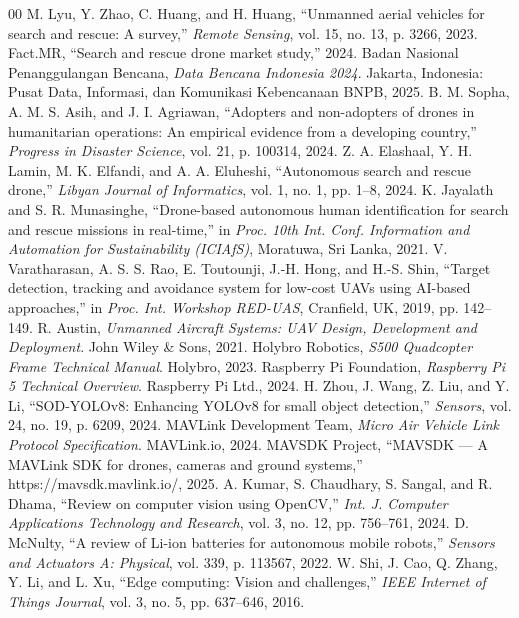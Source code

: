 \documentclass[conference]{IEEEtran}
\begin{document}
\begin{thebibliography}{00}
 M. Lyu, Y. Zhao, C. Huang, and H. Huang, ``Unmanned aerial vehicles for search and rescue: A survey,'' \textit{Remote Sensing}, vol. 15, no. 13, p. 3266, 2023.
 Fact.MR, ``Search and rescue drone market study,'' 2024.
 Badan Nasional Penanggulangan Bencana, \textit{Data Bencana Indonesia 2024}. Jakarta, Indonesia: Pusat Data, Informasi, dan Komunikasi Kebencanaan BNPB, 2025.
 B. M. Sopha, A. M. S. Asih, and J. I. Agriawan, ``Adopters and non-adopters of drones in humanitarian operations: An empirical evidence from a developing country,'' \textit{Progress in Disaster Science}, vol. 21, p. 100314, 2024.
 Z. A. Elashaal, Y. H. Lamin, M. K. Elfandi, and A. A. Eluheshi, ``Autonomous search and rescue drone,'' \textit{Libyan Journal of Informatics}, vol. 1, no. 1, pp. 1--8, 2024.
 K. Jayalath and S. R. Munasinghe, ``Drone-based autonomous human identification for search and rescue missions in real-time,'' in \textit{Proc. 10th Int. Conf. Information and Automation for Sustainability (ICIAfS)}, Moratuwa, Sri Lanka, 2021.
 V. Varatharasan, A. S. S. Rao, E. Toutounji, J.-H. Hong, and H.-S. Shin, ``Target detection, tracking and avoidance system for low-cost UAVs using AI-based approaches,'' in \textit{Proc. Int. Workshop RED-UAS}, Cranfield, UK, 2019, pp. 142--149.
 R. Austin, \textit{Unmanned Aircraft Systems: UAV Design, Development and Deployment}. John Wiley \& Sons, 2021.
 Holybro Robotics, \textit{S500 Quadcopter Frame Technical Manual}. Holybro, 2023.
 Raspberry Pi Foundation, \textit{Raspberry Pi 5 Technical Overview}. Raspberry Pi Ltd., 2024.
 H. Zhou, J. Wang, Z. Liu, and Y. Li, ``SOD-YOLOv8: Enhancing YOLOv8 for small object detection,'' \textit{Sensors}, vol. 24, no. 19, p. 6209, 2024.
 MAVLink Development Team, \textit{Micro Air Vehicle Link Protocol Specification}. MAVLink.io, 2024.
 MAVSDK Project, ``MAVSDK --- A MAVLink SDK for drones, cameras and ground systems,'' https://mavsdk.mavlink.io/, 2025.
 A. Kumar, S. Chaudhary, S. Sangal, and R. Dhama, ``Review on computer vision using OpenCV,'' \textit{Int. J. Computer Applications Technology and Research}, vol. 3, no. 12, pp. 756--761, 2024.
 D. McNulty, ``A review of Li-ion batteries for autonomous mobile robots,'' \textit{Sensors and Actuators A: Physical}, vol. 339, p. 113567, 2022.
 W. Shi, J. Cao, Q. Zhang, Y. Li, and L. Xu, ``Edge computing: Vision and challenges,'' \textit{IEEE Internet of Things Journal}, vol. 3, no. 5, pp. 637--646, 2016.
\end{thebibliography}
\end{document}
